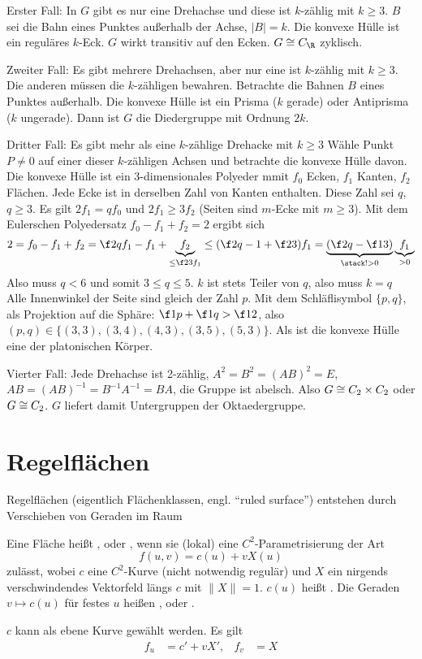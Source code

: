 Erster Fall:
In $G$ gibt es nur eine Drehachse und diese ist $k$-zählig mit $k \ge 3$.
$B$ sei die Bahn eines Punktes außerhalb der Achse, $|B| = k$.
Die konvexe Hülle ist ein reguläres $k$-Eck.
$G$ wirkt transitiv auf den Ecken.
$G \isomorphic C_\R$ zyklisch.

Zweiter Fall:
Es gibt mehrere Drehachsen, aber nur eine ist $k$-zählig mit $k \ge 3$.
Die anderen müssen die $k$-zähligen bewahren.
Betrachte die Bahnen $B$ eines Punktes außerhalb.
Die konvexe Hülle ist ein Prisma ($k$ gerade) oder Antiprisma ($k$ ungerade).
Dann ist $G$ die Diedergruppe mit Ordnung $2k$.

Dritter Fall:
Es gibt mehr als eine $k$-zählige Drehacke mit $k \ge 3$
Wähle Punkt $P \neq 0$ auf einer dieser $k$-zähligen Achsen und betrachte die konvexe Hülle davon.
Die konvexe Hülle ist ein 3-dimensionales Polyeder mmit $f_0$ Ecken, $f_1$ Kanten, $f_2$ Flächen.
Jede Ecke ist in derselben Zahl von Kanten enthalten.
Diese Zahl sei $q$, $q \ge 3$.
Es gilt $2 f_1 = q f_0$ und $2f_1 \ge 3 f_2$ (Seiten sind $m$-Ecke mit $m \ge 3$).
Mit dem Eulerschen Polyedersatz $f_0 - f_1 + f_2 = 2$ ergibt sich
\[
	2 = f_0 - f_1 + f_2
	= \f 2q f_1 - f_1 + \underbrace{f_2}_{\le \f 23 f_1}
	\le (\f 2q - 1 + \f 23) f_1
	= \underbrace{(\f 2q - \f 13)}_{\stack !> 0} \underbrace{f_1}_{> 0}
\]
Also muss $q < 6$ und somit $3 \le q \le 5$.
$k$ ist stets Teiler von $q$, also muss $k = q$
Alle Innenwinkel der Seite sind gleich der Zahl $p$.
Mit dem Schläflisymbol $\{p, q\}$, als Projektion auf die Sphäre: $\f 1p + \f 1q > \f 12$, also $(p,q) \in \{ (3,3), (3,4), (4, 3), (3,5), (5,3) \}$.
Als ist die konvexe Hülle eine der platonischen Körper.

Vierter Fall:
Jede Drehachse ist 2-zählig, $A^2 = B^2 = (AB)^2 = E$, $AB = (AB)^{-1} = B^{-1} A^{-1} = BA$, die Gruppe ist abelsch.
Also $G \cong C_2 \times C_2$ oder $G \cong C_2$.
$G$ liefert damit Untergruppen der Oktaedergruppe.




\section{Regelflächen}


Regelflächen (eigentlich Flächenklassen, engl. “ruled surface”) entstehen durch Verschieben von Geraden im Raum

\begin{df}
	Eine Fläche heißt , oder , wenn sie (lokal) eine $C^2$-Parametrisierung der Art
	\[
		f(u,v) = c(u) + v X(u)
	\]
	zulässt, wobei $c$ eine $C^2$-Kurve (nicht notwendig regulär) und $X$ ein nirgends verschwindendes Vektorfeld längs $c$ mit \oBdA $\|X\| = 1$.
	$c(u)$ heißt .
	Die Geraden $v \mapsto c(u)$ für festes $u$ heißen , oder .
	\begin{note}
		$c$ kann als ebene Kurve gewählt werden.
		Es gilt
		\begin{align*}
			f_u &= c' + vX', &
			f_v &= X
		\end{align*}
	\end{note}
\end{df}

